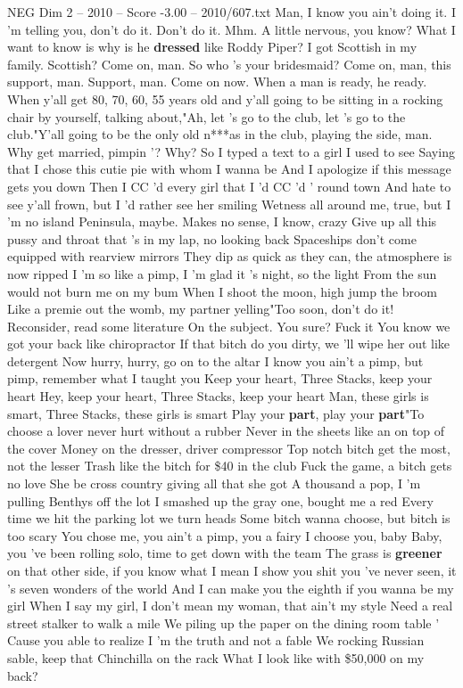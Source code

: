 \begin{textsample}{NEG Dim 2 – 2010 – Score -3.00 – 2010/607.txt}  \label{ex:f2_neg_003}
Man, I know you ain't doing it.
I 'm telling you, don't do it.
Don't do it.
Mhm.
A little nervous, you know?
What I want to know is why is he \textbf{dressed} like Roddy Piper?
I got Scottish in my family.
Scottish?
Come on, man.
So who 's your bridesmaid?
Come on, man, this support, man.
Support, man.
Come on now.
When a man is ready, he ready.
When y'all get 80, 70, 60, 55 years old and y'all going to be sitting in a rocking chair by yourself, talking about,"Ah, let 's go to the club, let 's go to the club."Y'all going to be the only old n***as in the club, playing the side, man.
Why get married, pimpin '?
Why?
So I typed a text to a girl I used to see Saying that I chose this cutie pie with whom I wanna be And I apologize if this message gets you down Then I CC 'd every girl that I 'd CC 'd ' round town And hate to see y'all frown, but I 'd rather see her smiling Wetness all around me, true, but I 'm no island Peninsula, maybe.
Makes no sense, I know, crazy Give up all this pussy and throat that 's in my lap, no looking back Spaceships don't come equipped with rearview mirrors They dip as quick as they can, the atmosphere is now ripped I 'm so like a pimp, I 'm glad it 's night, so the light From the sun would not burn me on my bum When I shoot the moon, high jump the broom Like a premie out the womb, my partner yelling"Too soon, don't do it!
Reconsider, read some literature On the subject.
You sure?
Fuck it You know we got your back like chiropractor If that bitch do you dirty, we 'll wipe her out like detergent Now hurry, hurry, go on to the altar I know you ain't a pimp, but pimp, remember what I taught you Keep your heart, Three Stacks, keep your heart Hey, keep your heart, Three Stacks, keep your heart Man, these girls is smart, Three Stacks, these girls is smart Play your \textbf{part}, play your \textbf{part}"To choose a lover never hurt without a rubber Never in the sheets like an on top of the cover Money on the dresser, driver compressor Top notch bitch get the most, not the lesser Trash like the bitch for \$40 in the club Fuck the game, a bitch gets no love She be cross country giving all that she got A thousand a pop, I 'm pulling Benthys off the lot I smashed up the gray one, bought me a red Every time we hit the parking lot we turn heads Some bitch wanna choose, but bitch is too scary You chose me, you ain't a pimp, you a fairy I choose you, baby Baby, you 've been rolling solo, time to get down with the team The grass is \textbf{greener} on that other side, if you know what I mean I show you shit you 've never seen, it 's seven wonders of the world And I can make you the eighth if you wanna be my girl When I say my girl, I don't mean my woman, that ain't my style Need a real street stalker to walk a mile We piling up the paper on the dining room table ' Cause you able to realize I 'm the truth and not a fable We rocking Russian sable, keep that Chinchilla on the rack What I look like with \$50,000 on my back?

\end{textsample}
